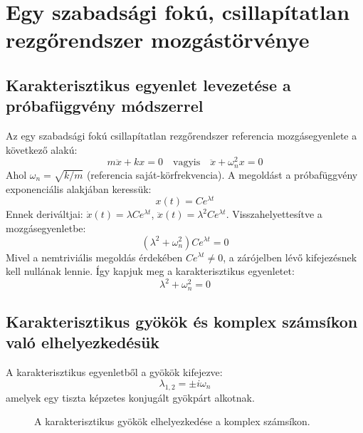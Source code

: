 \section{Egy szabadsági fokú, csillapítatlan rezgőrendszer mozgástörvénye}

\subsection*{Karakterisztikus egyenlet levezetése a próbafüggvény módszerrel}
Az egy szabadsági fokú csillapítatlan rezgőrendszer referencia mozgásegyenlete a következő alakú:
\begin{equation}
    m\ddot{x} + kx = 0 \quad \text{vagyis} \quad \ddot{x} + \omega_{n}^2 x = 0
\end{equation}
Ahol $\omega_n = \sqrt{k/m}$ (referencia saját-körfrekvencia).
A megoldást a próbafüggvény exponenciális alakjában keressük:
\begin{equation}
    x(t) = C e^{\lambda t}
\end{equation}
Ennek deriváltjai: $\dot{x}(t) = \lambda C e^{\lambda t}$, $\ddot{x}(t) = \lambda^2 C e^{\lambda t}$. Visszahelyettesítve a mozgásegyenletbe:
\begin{equation}
    \left( \lambda^2 + \omega_n^2 \right) C e^{\lambda t} = 0
\end{equation}
Mivel a nemtriviális megoldás érdekében $C e^{\lambda t} \neq 0$, a zárójelben lévő kifejezésnek kell nullának lennie. Így kapjuk meg a karakterisztikus egyenletet:
\begin{equation}
    \lambda^2 + \omega_n^2 = 0
\end{equation}

\newpage
\subsection*{Karakterisztikus gyökök és komplex számsíkon való elhelyezkedésük}
A karakterisztikus egyenletből a gyökök kifejezve:
\begin{equation}
    \lambda_{1,2} = \pm i \omega_n
\end{equation}
amelyek egy tiszta képzetes konjugált gyökpárt alkotnak.
\begin{figure}[H]
    \centering
    \caption{A karakterisztikus gyökök elhelyezkedése a komplex számsíkon.}
\end{figure}

